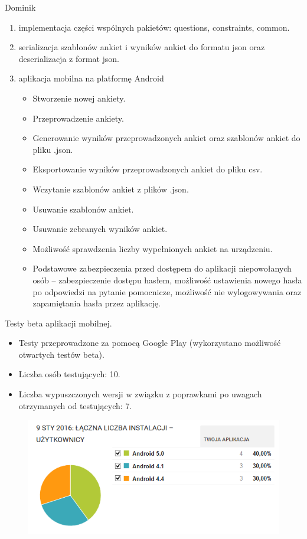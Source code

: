 \documentclass[a4paper,10pt]{beamer}
\begin{document}
	\begin{frame}{Dominik}
		\begin{enumerate}
			\item	implementacja części wspólnych pakietów: questions, constraints, common.
			\item	serializacja szablonów ankiet i wyników ankiet do formatu json oraz deserializacja z format json.
			\item	aplikacja mobilna na platformę Android	
			\begin{itemize}
				\item	Stworzenie nowej ankiety.
				\item	Przeprowadzenie ankiety.
				\item	Generowanie wyników przeprowadzonych ankiet oraz szablonów ankiet do pliku .json.
				\item	Eksportowanie wyników przeprowadzonych ankiet do pliku csv.
				\item	Wczytanie szablonów ankiet z plików .json.
				\item	Usuwanie szablonów ankiet.
				\item	Usuwanie zebranych wyników ankiet.
				\item	Możliwość sprawdzenia liczby wypełnionych ankiet na urządzeniu.
				\item	Podstawowe zabezpieczenia przed dostępem do aplikacji niepowołanych osób – zabezpieczenie dostępu hasłem, możliwość ustawienia nowego hasła po odpowiedzi na pytanie pomocnicze, możliwość nie wylogowywania oraz zapamiętania hasła przez aplikację.
			\end{itemize}
		\end{enumerate}
	\end{frame}
	
	\begin{frame}{Testy beta aplikacji mobilnej.}
			\begin{itemize}
				\item Testy przeprowadzone za pomocą Google Play (wykorzystano możliwość otwartych testów beta).
				\item Liczba osób testujących: 10.
				\item Liczba wypuszczonych wersji w związku z poprawkami po uwagach otrzymanych od testujących: 7.
			\end{itemize}
			
			\begin{figure}[H]
				\includegraphics[scale=0.6]{prezentacja_obronaII_zdjecia/wersje_android.png}
			\end{figure}
	\end{frame}
	
\end{document}
